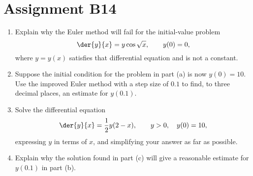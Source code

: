 \section{Assignment B14}

\begin{problem}
    \begin{enumerate}
        \item Explain why the Euler method will fail for the initial-value problem \[\der{y}{x} = y \cos \sqrt x, \qquad y(0) = 0,\] where $y = y(x)$ satisfies that differential equation and is not a constant.
        \item Suppose the initial condition for the problem in part (a) is now $y(0) = 10$. Use the improved Euler method with a step size of $0.1$ to find, to three decimal places, an estimate for $y(0.1)$.
        \item Solve the differential equation \[\der{y}{x} = \frac12 y (2-x), \qquad y > 0, \quad y(0) = 10,\] expressing $y$ in terms of $x$, and simplifying your answer as far as possible.
        \item Explain why the solution found in part (c) will give a reasonable estimate for $y(0.1)$ in part (b).
    \end{enumerate}
\end{problem}
